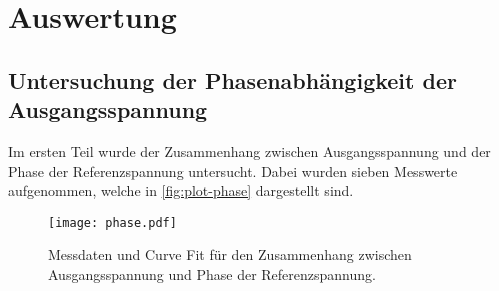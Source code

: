 \section{Auswertung}
\label{sec:Auswertung}

\subsection{Untersuchung der Phasenabhängigkeit der Ausgangsspannung}
\label{sec:Untersuchung der Phasenabhängigkeit der Ausgangsspannung}
Im ersten Teil wurde der Zusammenhang zwischen Ausgangsspannung und der Phase der
Referenzspannung untersucht. Dabei wurden sieben Messwerte aufgenommen, welche in
\autoref{fig:plot-phase} dargestellt sind.
\begin{figure}
	\centering
	\texttt{[image: phase.pdf]}
	\caption{Messdaten und Curve Fit für den Zusammenhang zwischen Ausgangsspannung und
	Phase der Referenzspannung.}
	\label{fig:plot-phase}
\end{figure}

